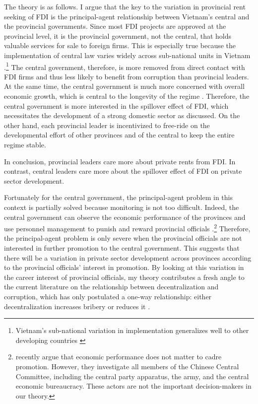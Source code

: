 The theory is as follows. I argue that the key to the variation in provincial rent seeking of FDI is the principal-agent relationship between Vietnam's central and the provincial governments. Since most FDI projects are approved at the provincial level, it is the provincial government, not the central, that holds valuable services for sale to foreign firms. This is especially true because the implementation of central law varies widely across sub-national units in Vietnam \citep{Meyer2005}.\footnote{Vietnam's sub-national variation in implementation generalizes well to other developing countries \citep{Thun2006}} The central government, therefore, is more removed from direct contact with FDI firms and thus less likely to benefit from corruption than provincial leaders. At the same time, the central government is much more concerned with overall economic growth, which is central to the longevity of the regime \citep{Malesky2008}. Therefore, the central government is more interested in the spillover effect of FDI, which necessitates the development of a strong domestic sector as discussed.  On the other hand, each provincial leader is incentivized to free-ride on the developmental effort of other provinces and of the central to keep the entire regime stable. 

In conclusion, provincial leaders care more about private rents from FDI. In contrast, central leaders care more about the spillover effect of FDI on private sector development.

Fortunately for the central government, the principal-agent problem in this context is partially solved because monitoring is not too difficult. Indeed, the central government can observe the economic performance of the provinces and use personnel management to punish and reward provincial officials \citep{Sheng2007, Li2005}.\footnote{\citet{Shih2012} recently argue that economic performance does not matter to cadre promotion. However, they investigate all members of the Chinese Central Committee, including the central party apparatus, the army, and the central economic bureaucracy. These actors are not the important decision-makers in our theory.} Therefore, the principal-agent problem is only severe when the provincial officials are not interested in further promotion to the central government. This suggests that there will be a variation in private sector development across provinces according to the provincial officials' interest in promotion. By looking at this variation in the career interest of provincial officials, my theory contributes a fresh angle to the current literature on the relationship between decentralization and corruption, which has only postulated a one-way relationship: either decentralization increases bribery \citep{Fan2009} or reduces it \citep{Guerra2009}.

